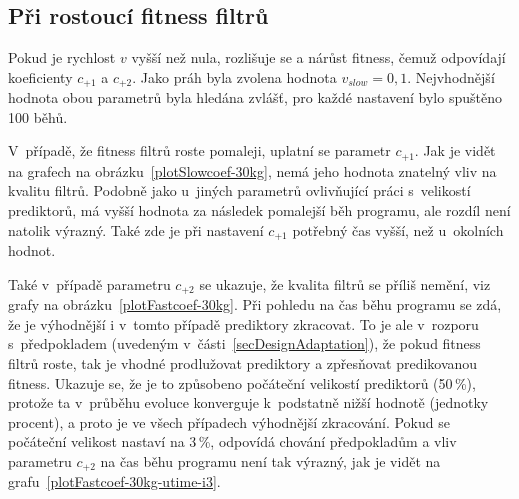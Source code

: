 \subsection*{Při rostoucí fitness filtrů}

Pokud je rychlost $v$ vyšší než nula, rozlišuje se  a  nárůst fitness, čemuž odpovídají koeficienty $c_{+1}$ a $c_{+2}$. Jako práh byla zvolena hodnota $v_\mathit{slow} = 0,1$. Nejvhodnější hodnota obou parametrů byla hledána zvlášť, pro každé nastavení bylo spuštěno 100 běhů.

V~případě, že fitness filtrů roste pomaleji, uplatní se parametr $c_{+1}$. Jak je vidět na grafech na obrázku~\ref{plotSlowcoef-30kg}, nemá jeho hodnota znatelný vliv na kvalitu filtrů. Podobně jako u~jiných parametrů ovlivňující práci s~velikostí prediktorů, má vyšší hodnota za následek pomalejší běh programu, ale rozdíl není natolik výrazný. Také zde je při nastavení $c_{+1}$ potřebný čas vyšší, než u~okolních hodnot.

Také v~případě parametru $c_{+2}$ se ukazuje, že kvalita filtrů se příliš nemění, viz grafy na obrázku~\ref{plotFastcoef-30kg}. Při pohledu na čas běhu programu se zdá, že je výhodnější i v~tomto případě prediktory zkracovat. To je ale v~rozporu s~předpokladem (uvedeným v~části~\ref{secDesignAdaptation}), že pokud fitness filtrů roste, tak je vhodné prodlužovat prediktory a zpřesňovat predikovanou fitness. Ukazuje se, že je to způsobeno počáteční velikostí prediktorů (50\,\%), protože ta v~průběhu evoluce konverguje k~podstatně nižší hodnotě (jednotky procent), a proto je ve všech případech výhodnější zkracování. Pokud se počáteční velikost nastaví na 3\,\%, odpovídá chování předpokladům a vliv parametru $c_{+2}$ na čas běhu programu není tak výrazný, jak je vidět na grafu~\ref{plotFastcoef-30kg-utime-i3}.

